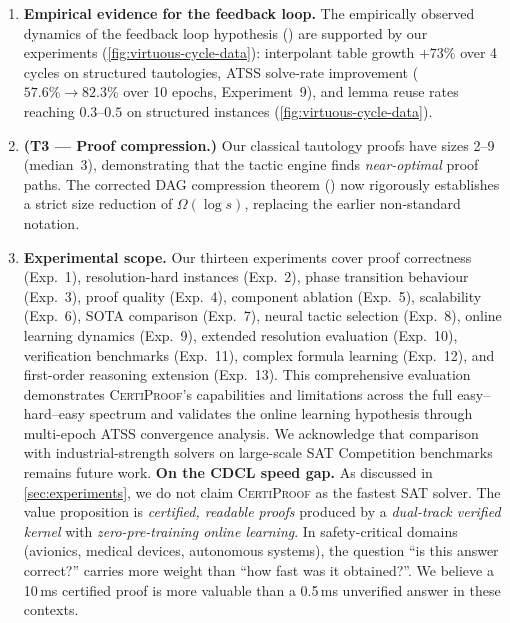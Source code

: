 \documentclass[acmtocl,review,anonymous]{acmart}
\newcommand{\CP}{\textsc{CertiProof}}
\begin{document}
\begin{enumerate}
  \item \textbf{Empirical evidence for the feedback loop.}
    The empirically observed dynamics of the feedback loop
    hypothesis () are supported by our
    experiments (\cref{fig:virtuous-cycle-data}):
    interpolant table growth $+73\%$ over 4 cycles on structured
    tautologies, ATSS solve-rate improvement ($57.6\% \to 82.3\%$
    over 10 epochs, Experiment~9), and lemma reuse rates reaching
    $0.3$--$0.5$ on structured instances
    (\cref{fig:virtuous-cycle-data}).

  \item \textbf{(T3 --- Proof compression.)}  Our classical
    tautology proofs have sizes 2--9 (median~3), demonstrating that
    the tactic engine finds \emph{near-optimal} proof paths.  The
    corrected DAG compression theorem () now
    rigorously establishes a strict size reduction of
    $\Omega(\log s)$, replacing the earlier non-standard notation.

  \item \textbf{Experimental scope.}  Our thirteen experiments cover
    proof correctness (Exp.~1), resolution-hard instances
    (Exp.~2), phase transition behaviour (Exp.~3),
    proof quality (Exp.~4), component ablation
    (Exp.~5), scalability (Exp.~6), SOTA comparison
    (Exp.~7), neural tactic selection (Exp.~8),
    online learning dynamics (Exp.~9), extended
    resolution evaluation (Exp.~10), verification benchmarks
    (Exp.~11), complex formula learning (Exp.~12), and first-order
    reasoning extension (Exp.~13).  This
    comprehensive evaluation demonstrates \CP{}'s capabilities and
    limitations across the full easy--hard--easy spectrum and
    validates the online learning hypothesis through multi-epoch
    ATSS convergence analysis.
    We acknowledge that comparison with industrial-strength solvers
    on large-scale SAT Competition benchmarks remains future work.
    \textbf{On the CDCL speed gap.}  As discussed in
    \cref{sec:experiments}, we do not claim \CP{} as the fastest SAT
    solver.  The value proposition is \emph{certified, readable proofs}
    produced by a \emph{dual-track verified kernel} with
    \emph{zero-pre-training online learning}.  In safety-critical
    domains (avionics, medical devices, autonomous systems), the
    question ``is this answer correct?'' carries more weight than
    ``how fast was it obtained?''.  We believe a 10\,ms certified
    proof is more valuable than a 0.5\,ms unverified answer in
    these contexts.


\end{enumerate}
\end{document}
